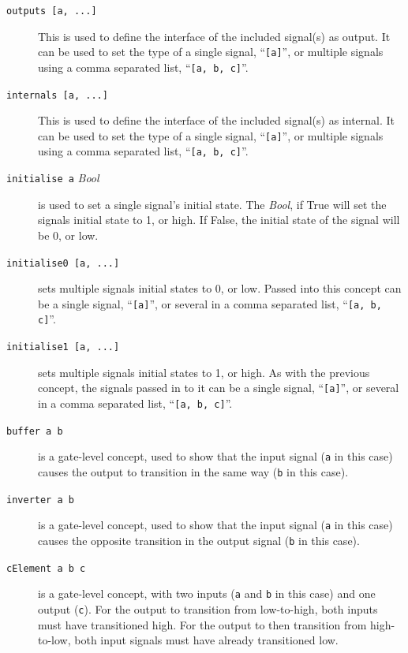 \documentclass{proc}
\begin{document}
\begin{description}
   \item [\texttt{outputs [a, ...]}] This is used to define the interface of the included signal(s) as output. It can be used to set the type of a single signal, ``\texttt{[a]}'', or multiple signals 
   using a comma separated list, ``\texttt{[a, b, c]}''.
   
   \item [\texttt{internals [a, ...]}] This is used to define the interface of the included signal(s) as internal. It can be used to set the type of a single signal, ``\texttt{[a]}'', or multiple 
   signals using a comma separated list, ``\texttt{[a, b, c]}''.
  
  \item [\texttt{initialise a} \emph{Bool}] is used to set a single signal's initial state. The \emph{Bool}, if True will set the signals initial state to 1, or high. If False, the initial state of the 
  signal will be 0, or low. 

  \item [\texttt{initialise0 [a, ...]}] sets multiple signals initial states to 0, or low. Passed into this concept can be a single signal, ``\texttt{[a]}'', or several in a comma separated list, 
  ``\texttt{[a, b, c]}''.
  
  \item [\texttt{initialise1 [a, ...]}] sets multiple signals initial states to 1, or high. As with the previous concept, the signals passed in to it can be a single signal, ``\texttt{[a]}'', or several 
in a comma separated list, ``\texttt{[a, b, c]}''.
  
  \item [\texttt{buffer a b}] is a gate-level concept, used to show that the input signal (\texttt{a} in this case) causes the output to transition in the same way (\texttt{b} in this case). 
  
  \item [\texttt{inverter a b}] is a gate-level concept, used to show that the input signal (\texttt{a} in this case) causes the opposite transition in the output signal (\texttt{b} in this case).
  
  \item [\texttt{cElement a b c}] is a gate-level concept, with two inputs (\texttt{a} and \texttt{b} in this case) and one output (\texttt{c}). For the output to transition from low-to-high, 
  both inputs must have transitioned high. For the output to then transition from high-to-low, both input signals must have already transitioned low.
  

\end{description}
\end{document}
